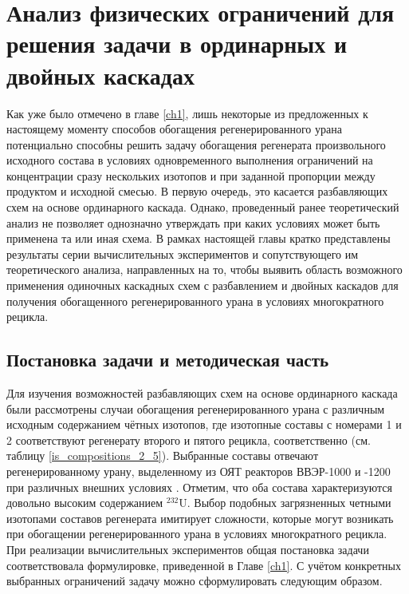 \chapter{Анализ физических ограничений для решения задачи в ординарных и двойных каскадах}\label{ch:ch2}

Как уже было отмечено в главе \ref{ch1}, лишь некоторые из предложенных к настоящему моменту способов обогащения регенерированного урана потенциально способны решить задачу обогащения регенерата произвольного исходного состава в условиях одновременного выполнения ограничений на концентрации сразу нескольких изотопов и при заданной пропорции между продуктом и исходной смесью. В первую очередь, это касается разбавляющих схем на основе ординарного каскада. 
Однако, проведенный ранее теоретический анализ не позволяет однозначно утверждать при каких условиях может быть применена та или иная схема. В рамках настоящей главы кратко представлены результаты серии вычислительных экспериментов и сопутствующего им теоретического анализа, направленных на то, чтобы выявить область возможного применения одиночных каскадных схем с разбавлением и двойных каскадов для получения обогащенного регенерированного урана в условиях многократного рецикла. 

\section{Постановка задачи и методическая часть}\label{ch2_stat}

Для изучения возможностей разбавляющих схем на основе ординарного каскада были рассмотрены случаи обогащения регенерированного урана с различным исходным содержанием чётных изотопов, где изотопные составы с номерами 1 и 2 соответствуют регенерату второго и пятого рецикла, соответственно (см. таблицу \ref{is_compositions_2_5}). Выбранные составы отвечают регенерированному урану, выделенному из ОЯТ реакторов ВВЭР-1000 и -1200 при различных внешних условиях \cite{palkinDesignanalyticalResearchRefinement2010,nevinicaToplivnyyCiklLegkovodnogo2019}. Отметим, что оба состава характеризуются довольно высоким содержанием $^{232}$U. Выбор подобных загрязненных четными изотопами составов регенерата имитирует сложности, которые могут возникать при обогащении регенерированного урана в условиях многократного рецикла.  
При реализации вычислительных экспериментов общая постановка задачи соответствовала формулировке, приведенной в Главе \ref{ch1}. С учётом конкретных выбранных ограничений задачу можно сформулировать следующим образом.

